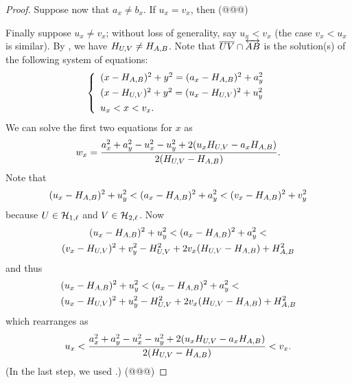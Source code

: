 \begin{proof}
Suppose now that \(a_x \neq b_x\).
If \(u_x = v_x\), then (@@@)

Finally suppose \(u_x \neq v_x\); without loss of generality, say \(u_x < v_x\) (the case \(v_x < u_x\) is similar).
By , we have \(H_{U,V} \neq H_{A,B}\).
Note that \(\overline{UV} \cap \overleftrightarrow{AB}\) is the solution(s) of the following system of equations: \[ \left\{ \begin{array}{l} (x - H_{A,B})^2 + y^2 = (a_x - H_{A,B})^2 + a_y^2 \\[4pt] (x - H_{U,V})^2 + y^2 = (u_x - H_{U,V})^2 + u_y^2 \\[4pt] u_x < x < v_x. \end{array} \right. \]
We can solve the first two equations for \(x\) as \[ w_x = \frac{a_x^2 + a_y^2 - u_x^2 - u_y^2 + 2(u_xH_{U,V} - a_xH_{A,B})}{2(H_{U,V} - H_{A,B})}. \]
Note that \[ (u_x - H_{A,B})^2 + u_y^2 < (a_x - H_{A,B})^2 + a_y^2 < (v_x - H_{A,B})^2 + v_y^2 \] because \(U \in \mathcal{H}_{1,\ell}\) and \(V \in \mathcal{H}_{2,\ell}\).
Now
\begin{multline*}
(u_x - H_{A,B})^2 + u_y^2 < (a_x - H_{A,B})^2 + a_y^2 < \\
  (v_x - H_{U,V})^2 + v_y^2 - H_{U,V}^2 + 2v_x(H_{U,V} - H_{A,B}) + H_{A,B}^2
\end{multline*}
and thus
\begin{multline*}
(u_x - \HHPIDEALPOINT{A}{B})^2 + u_y^2 < (a_x - \HHPIDEALPOINT{A}{B})^2 + a_y^2 < \hfill \\
  (u_x - \HHPIDEALPOINT{U}{V})^2 + u_y^2 - \HHPIDEALPOINT{U}{V}^2 + 2v_x(\HHPIDEALPOINT{U}{V} - \HHPIDEALPOINT{A}{B}) + \HHPIDEALPOINT{A}{B}^2
\end{multline*}
which rearranges as \[ u_x < \frac{a_x^2 + a_y^2 - u_x^2 - u_y^2 + 2(u_xH_{U,V} - a_xH_{A,B})}{2(H_{U,V} - H_{A,B})} < v_x. \] (In the last step, we used .)
(@@@)
\end{proof}
